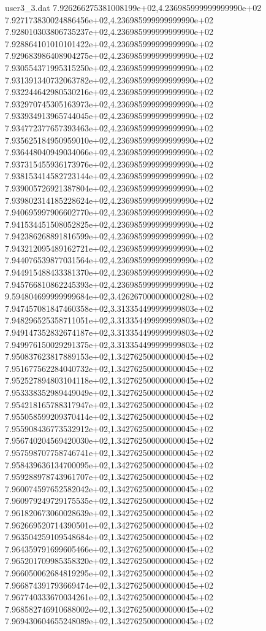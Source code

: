 \begin{filecontents}{user3_3.dat}
7.926266275381008199e+02,4.236985999999999990e+02
7.927173830024886456e+02,4.236985999999999990e+02
7.928010303806735237e+02,4.236985999999999990e+02
7.928864101010101422e+02,4.236985999999999990e+02
7.929683986408904275e+02,4.236985999999999990e+02
7.930554371995315250e+02,4.236985999999999990e+02
7.931391340732063782e+02,4.236985999999999990e+02
7.932244642980530216e+02,4.236985999999999990e+02
7.932970745305163973e+02,4.236985999999999990e+02
7.933934913965744045e+02,4.236985999999999990e+02
7.934772377657393463e+02,4.236985999999999990e+02
7.935625184950959010e+02,4.236985999999999990e+02
7.936448040949034066e+02,4.236985999999999990e+02
7.937315455936173976e+02,4.236985999999999990e+02
7.938153414582723144e+02,4.236985999999999990e+02
7.939005726921387804e+02,4.236985999999999990e+02
7.939802314185228624e+02,4.236985999999999990e+02
7.940695997906602770e+02,4.236985999999999990e+02
7.941534451508052825e+02,4.236985999999999990e+02
7.942386268891816599e+02,4.236985999999999990e+02
7.943212095489162721e+02,4.236985999999999990e+02
7.944076539877031564e+02,4.236985999999999990e+02
7.944915488433381370e+02,4.236985999999999990e+02
7.945766810862245393e+02,4.236985999999999990e+02
9.594804699999999684e+02,3.426267000000000280e+02
7.947457081847460358e+02,3.313354499999999803e+02
7.948296525358711051e+02,3.313354499999999803e+02
7.949147352832674187e+02,3.313354499999999803e+02
7.949976150029291375e+02,3.313354499999999803e+02
7.950837623817889153e+02,1.342762500000000045e+02
7.951677562284040732e+02,1.342762500000000045e+02
7.952527894803104118e+02,1.342762500000000045e+02
7.953338352989449049e+02,1.342762500000000045e+02
7.954218165788317947e+02,1.342762500000000045e+02
7.955058599209370414e+02,1.342762500000000045e+02
7.955908436773532912e+02,1.342762500000000045e+02
7.956740204569420030e+02,1.342762500000000045e+02
7.957598707758746741e+02,1.342762500000000045e+02
7.958439636134700095e+02,1.342762500000000045e+02
7.959288978743961707e+02,1.342762500000000045e+02
7.960074597652582042e+02,1.342762500000000045e+02
7.960979249729175535e+02,1.342762500000000045e+02
7.961820673060028639e+02,1.342762500000000045e+02
7.962669520714390501e+02,1.342762500000000045e+02
7.963504259109548684e+02,1.342762500000000045e+02
7.964359791699605466e+02,1.342762500000000045e+02
7.965201709985358320e+02,1.342762500000000045e+02
7.966050062684819295e+02,1.342762500000000045e+02
7.966874391793669474e+02,1.342762500000000045e+02
7.967740333670034261e+02,1.342762500000000045e+02
7.968582746910688002e+02,1.342762500000000045e+02
7.969430604655248089e+02,1.342762500000000045e+02

\end{filecontents}

